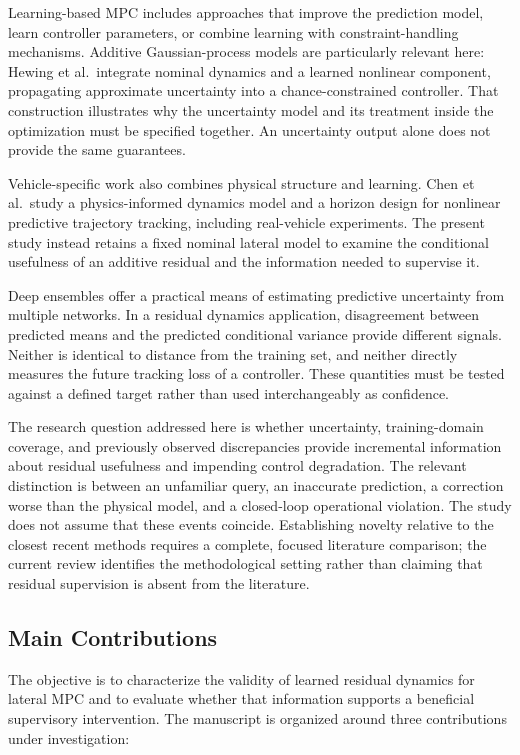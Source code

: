 \documentclass[10pt,journal]{IEEEtran}
\begin{document}
Learning-based MPC includes approaches that improve the prediction model, learn controller parameters, or combine learning with constraint-handling mechanisms\cite{hewingReview2020}. Additive Gaussian-process models are particularly relevant here: Hewing et al.\ integrate nominal dynamics and a learned nonlinear component, propagating approximate uncertainty into a chance-constrained controller\cite{hewingCautious2019}. That construction illustrates why the uncertainty model and its treatment inside the optimization must be specified together. An uncertainty output alone does not provide the same guarantees.

Vehicle-specific work also combines physical structure and learning. Chen et al.\ study a physics-informed dynamics model and a horizon design for nonlinear predictive trajectory tracking, including real-vehicle experiments\cite{chenExperimentalEvaluationTrajectory2026a}. The present study instead retains a fixed nominal lateral model to examine the conditional usefulness of an additive residual and the information needed to supervise it.

Deep ensembles offer a practical means of estimating predictive uncertainty from multiple networks\cite{lakshminarayanan2017}. In a residual dynamics application, disagreement between predicted means and the predicted conditional variance provide different signals. Neither is identical to distance from the training set, and neither directly measures the future tracking loss of a controller. These quantities must be tested against a defined target rather than used interchangeably as confidence.

The research question addressed here is whether uncertainty, training-domain coverage, and previously observed discrepancies provide incremental information about residual usefulness and impending control degradation. The relevant distinction is between an unfamiliar query, an inaccurate prediction, a correction worse than the physical model, and a closed-loop operational violation. The study does not assume that these events coincide. Establishing novelty relative to the closest recent methods requires a complete, focused literature comparison; the current review identifies the methodological setting rather than claiming that residual supervision is absent from the literature.

\subsection{Main Contributions}
The objective is to characterize the validity of learned residual dynamics for lateral MPC and to evaluate whether that information supports a beneficial supervisory intervention. The manuscript is organized around three contributions under investigation:
\end{document}
